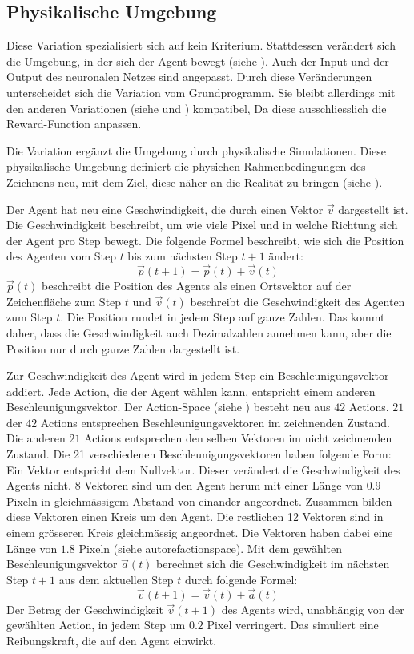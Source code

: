\subsection{Physikalische Umgebung}\label{sub:m_var_phy}
Diese Variation spezialisiert sich auf kein Kriterium. Stattdessen verändert
sich die Umgebung, in der sich der Agent bewegt (siehe ).
Auch der Input und der Output des neuronalen Netzes sind angepasst. Durch diese
Veränderungen unterscheidet sich die Variation vom Grundprogramm. Sie bleibt
allerdings mit den anderen Variationen (siehe  und
) kompatibel, Da diese ausschliesslich die
Reward-Function anpassen.

Die Variation ergänzt die Umgebung durch physikalische Simulationen. Diese
physikalische Umgebung definiert die physichen Rahmenbedingungen des Zeichnens
neu, mit dem Ziel, diese näher an die Realität zu bringen (siehe
). 

Der Agent hat neu eine Geschwindigkeit, die durch einen Vektor $\vec{v}$
dargestellt ist. Die Geschwindigkeit beschreibt, um wie viele Pixel und in
welche Richtung sich der Agent pro Step bewegt. Die folgende Formel beschreibt,
wie sich die Position des Agenten vom Step $t$ bis zum nächsten Step $t+1$
ändert:
\[ \vec{p}(t+1) = \vec{p}(t) + \vec{v}(t) \] 
$\vec{p}(t)$ beschreibt die Position des Agents als einen Ortsvektor auf der
Zeichenfläche zum Step $t$ und $\vec{v}(t)$ beschreibt die Geschwindigkeit des
Agenten zum Step $t$. Die Position rundet in jedem Step auf ganze Zahlen. Das
kommt daher, dass die Geschwindigkeit auch Dezimalzahlen annehmen kann, aber die
Position nur durch ganze Zahlen dargestellt ist.

Zur Geschwindigkeit des Agent wird in jedem Step ein Beschleunigungsvektor
addiert. Jede Action, die der Agent wählen kann, entspricht einem anderen
Beschleunigungsvektor. Der Action-Space (siehe ) besteht
neu aus $42$ Actions. $21$ der $42$ Actions entsprechen Beschleunigungsvektoren
im zeichnenden Zustand. Die anderen $21$ Actions entsprechen den selben Vektoren
im nicht zeichnenden Zustand. Die 21 verschiedenen Beschleunigungsvektoren haben
folgende Form: Ein Vektor entspricht dem Nullvektor. Dieser verändert die
Geschwindigkeit des Agents nicht. $8$ Vektoren sind um den Agent herum mit
einer Länge von $0.9$ Pixeln in gleichmässigem Abstand von einander angeordnet. %
Zusammen bilden diese Vektoren einen Kreis um den Agent. Die restlichen 12
Vektoren sind in einem grösseren Kreis gleichmässig angeordnet. Die Vektoren
haben dabei eine Länge von $1.8$ Pixeln (siehe autoref{actionspace}).  Mit dem
gewählten Beschleunigungsvektor $\vec{a}(t)$ berechnet sich die Geschwindigkeit
im nächsten Step $t+1$ aus dem aktuellen Step $t$ durch folgende Formel:
\[ \vec{v}(t+1) = \vec{v}(t) + \vec{a}(t) \] 
Der Betrag der Geschwindigkeit $\vec{v}(t+1)$ des Agents wird, unabhängig von
der gewählten Action, in jedem Step um $0.2$ Pixel verringert. Das simuliert eine
Reibungskraft, die auf den Agent einwirkt.

